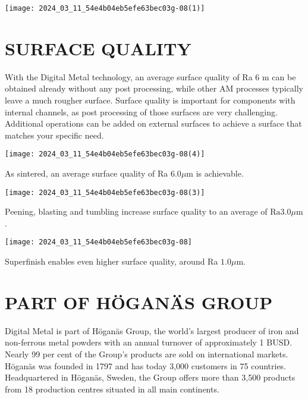 \documentclass[10pt]{article}
\begin{document}
\begin{center}
\texttt{[image: 2024\_03\_11\_54e4b04eb5efe63bec03g-08(1)]}
\end{center}

\section*{SURFACE QUALITY}
With the Digital Metal technology, an average surface quality of Ra 6 m can be obtained already without any post processing, while other AM processes typically leave a much rougher surface. Surface quality is important for components with internal channels, as post processing of those surfaces are very challenging. Additional operations can be added on external surfaces to achieve a surface that matches your specific need.

\begin{center}
\texttt{[image: 2024\_03\_11\_54e4b04eb5efe63bec03g-08(4)]}
\end{center}

As sintered, an average surface quality of Ra $6.0 \mu \mathrm{m}$ is achievable.

\begin{center}
\texttt{[image: 2024\_03\_11\_54e4b04eb5efe63bec03g-08(3)]}
\end{center}

Peening, blasting and tumbling increase surface quality to an average of $\mathrm{Ra} 3.0 \mu \mathrm{m}$.

\begin{center}
\texttt{[image: 2024\_03\_11\_54e4b04eb5efe63bec03g-08]}
\end{center}

Superfinish enables even higher surface quality, around Ra $1.0 \mu \mathrm{m}$.

\section*{PART OF HÖGANÄS GROUP}
Digital Metal is part of Höganäs Group, the world's largest producer of iron and non-ferrous metal powders with an annual turnover of approximately 1 BUSD. Nearly 99 per cent of the Group's products are sold on international markets. Höganäs was founded in 1797 and has today 3,000 customers in 75 countries. Headquartered in Höganäs, Sweden, the Group offers more than 3,500 products from 18 production centres situated in all main continents.
\end{document}
